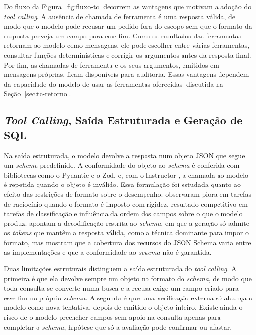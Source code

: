 Do fluxo da Figura~\ref{fig:fluxo-tc} decorrem as vantagens que motivam a adoção do \textit{tool calling}. A ausência de chamada de ferramenta é uma resposta válida, de modo que o modelo pode recusar um pedido fora do escopo sem que o formato da resposta preveja um campo para esse fim. Como os resultados das ferramentas retornam ao modelo como mensagens, ele pode escolher entre várias ferramentas, consultar funções determinísticas e corrigir os argumentos antes da resposta final. Por fim, as chamadas de ferramenta e os seus argumentos, emitidos em mensagens próprias, ficam disponíveis para auditoria. Essas vantagens dependem da capacidade do modelo de usar as ferramentas oferecidas, discutida na Seção~\ref{sec:tc-retorno}.

\subsection{\texorpdfstring{\textit{Tool Calling}, Saída Estruturada e Geração de SQL}{Tool Calling, Saída Estruturada e Geração de SQL}}
\label{sec:tc-se-sql}

Na saída estruturada, o modelo devolve a resposta num objeto JSON que segue um \textit{schema} predefinido. A conformidade do objeto ao \textit{schema} é conferida com bibliotecas como o Pydantic \cite{pydantic2019} e o Zod, e, com o Instructor \cite{instructor2023}, a chamada ao modelo é repetida quando o objeto é inválido. Essa formulação foi estudada quanto ao efeito das restrições de formato sobre o desempenho.  observaram piora em tarefas de raciocínio quando o formato é imposto com rigidez, resultado competitivo em tarefas de classificação e influência da ordem dos campos sobre o que o modelo produz.  apontam a decodificação restrita ao \textit{schema}, em que a geração só admite os \textit{tokens} que mantêm a resposta válida, como a técnica dominante para impor o formato, mas mostram que a cobertura dos recursos do JSON Schema varia entre as implementações e que a conformidade ao \textit{schema} não é garantida.

Duas limitações estruturais distinguem a saída estruturada do \textit{tool calling}. A primeira é que ela devolve sempre um objeto no formato do \textit{schema}, de modo que toda consulta se converte numa busca e a recusa exige um campo criado para esse fim no próprio \textit{schema}. A segunda é que uma verificação externa só alcança o modelo como nova tentativa, depois de emitido o objeto inteiro. Existe ainda o risco de o modelo preencher campos sem apoio na consulta apenas para completar o \textit{schema}, hipótese que só a avaliação pode confirmar ou afastar.

